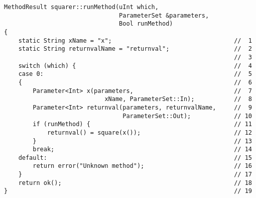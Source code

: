 \begin{verbatim}
MethodResult squarer::runMethod(uInt which,
                                ParameterSet &parameters,
                                Bool runMethod)
{
    static String xName = "x";                                  //  1
    static String returnvalName = "returnval";                  //  2
                                                                //  3
    switch (which) {                                            //  4
    case 0:                                                     //  5
    {                                                           //  6
        Parameter<Int> x(parameters,                            //  7
                            xName, ParameterSet::In);           //  8
        Parameter<Int> returnval(parameters, returnvalName,     //  9
                                 ParameterSet::Out);            // 10
        if (runMethod) {                                        // 11
            returnval() = square(x());                          // 12
        }                                                       // 13
        break;                                                  // 14
    default:                                                    // 15
        return error("Unknown method");                         // 16
    }                                                           // 17
    return ok();                                                // 18
}                                                               // 19
\end{verbatim}
          
